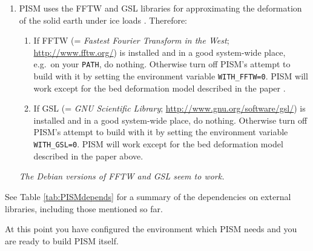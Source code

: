 \documentclass[12pt,final]{amsart}
\begin{document}
\begin{enumerate}
\item PISM uses the FFTW and GSL libraries for approximating the deformation of the solid earth under ice loads \cite{BLKfastearth}.  Therefore:
\renewcommand{\labelenumii}{(\roman{enumii})}\begin{enumerate}

\item If FFTW (= \emph{Fastest Fourier Transform in the West}; \url{http://www.fftw.org/}) is installed and in a good system-wide place, e.g.~on your \verb|PATH|, do nothing.  Otherwise turn off PISM's attempt to build with it by setting the environment variable \verb|WITH_FFTW=0|.  PISM will work except for the bed deformation model described in the paper \cite{BLKfastearth}.

\item If GSL (= \emph{GNU Scientific Library}; \url{http://www.gnu.org/software/gsl/}) is installed and in a good system-wide place, do nothing.  Otherwise turn off PISM's attempt to build with it by setting the environment variable \verb|WITH_GSL=0|.  PISM will work except for the bed deformation model described in the paper above.
\end{enumerate}
\emph{The Debian versions of FFTW and GSL seem to work.}
\end{enumerate}

\bigskip
See Table \ref{tab:PISMdepends} for a summary of the dependencies on external libraries, including those mentioned so far.

\medskip
At this point you have configured the environment which PISM needs and you are ready to build PISM itself.
\bigskip
\end{document}
